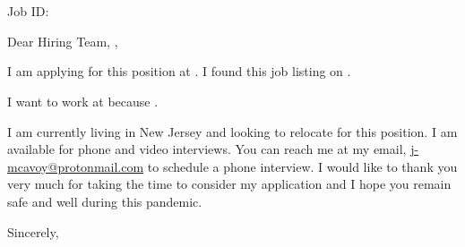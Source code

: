 \documentclass[11pt]{letter} %
\makeatletter
\newcommand{\myemail}{\href{mailto:j-mcavoy@protonmail.com}{j-mcavoy@protonmail.com}}
\makeatother
\begin{document}
\begin{letter}
    {\companyaddress
    {\ifdefempty{\jobid} {} {\\~\\Job ID: \jobid}}
    }


\opening{
  Dear
\ifdefempty{\companyhiringmanager}
{Hiring Team,}
{\companyhiringmanager,}
}

I am applying for this {\jobterm} {\jobtitle} position at {\company}. I found
this job listing on {\joblisting}.

I want to work at {\company} because \iwanttoworkherebecause.

{\intro}

{\previousjobdescription}

{\previousjobexperience}

I am currently living in New Jersey and looking to relocate for this position.
I am available for phone and video interviews. You can reach me at my email,
{\underline \myemail} to schedule a phone interview. I would like to thank you
very much for taking the time to consider my application and I hope you remain
safe and well during this pandemic.

\closing{Sincerely,}

\end{letter}
\end{document}

